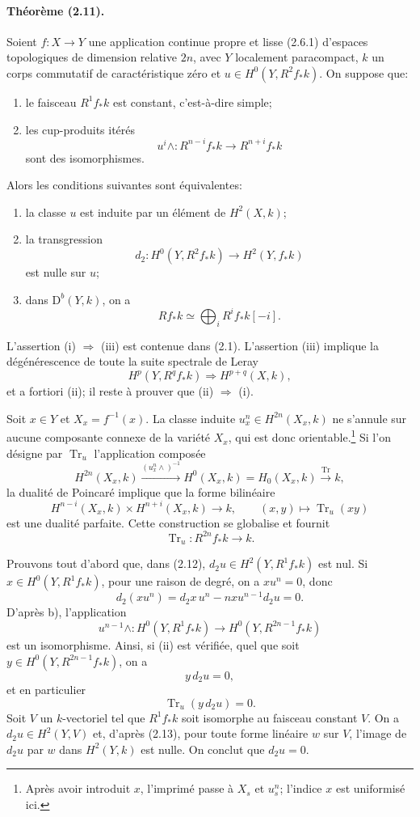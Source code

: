 \documentclass[10pt]{article}
\providecommand{\Tr}{\operatorname{Tr}}
\providecommand{\D}{\mathrm D}
\begin{document}
\paragraph{Théorème (2.11).} Soient $f:X\to Y$ une application continue propre et lisse (2.6.1) d'espaces topologiques de dimension relative $2n$, avec $Y$ localement paracompact, $k$ un corps commutatif de caractéristique zéro et
$u\in H^0(Y,R^2f_*k)$. On suppose que:
\begin{enumerate}[label=\alph*)]
\item le faisceau $R^1f_*k$ est constant, c'est-à-dire simple;
\item les cup-produits itérés
\[
 u^i\wedge:R^{n-i}f_*k\longrightarrow R^{n+i}f_*k
\]
sont des isomorphismes.
\end{enumerate}
Alors les conditions suivantes sont équivalentes:
\begin{enumerate}[label=(\roman*)]
\item la classe $u$ est induite par un élément de $H^2(X,k)$;
\item la transgression
\[
d_2:H^0(Y,R^2f_*k)\longrightarrow H^2(Y,f_*k)
\]
est nulle sur $u$;
\item dans $\D^b(Y,k)$, on a
\[
Rf_*k\simeq\bigoplus_iR^if_*k[-i].
\]
\end{enumerate}
L'assertion (i) $\Rightarrow$ (iii) est contenue dans (2.1). L'assertion (iii) implique la dégénérescence de toute la suite spectrale de Leray
\[
\tag{2.12}
H^p(Y,R^qf_*k)\Longrightarrow H^{p+q}(X,k),
\]
et a fortiori (ii); il reste à prouver que (ii) $\Rightarrow$ (i).

Soit $x\in Y$ et $X_x=f^{-1}(x)$. La classe induite $u_x^n\in H^{2n}(X_x,k)$ ne s'annule sur aucune composante connexe de la variété $X_x$, qui est donc orientable.\footnote{Après avoir introduit $x$, l'imprimé passe à $X_s$ et $u_s^n$; l'indice $x$ est uniformisé ici.} Si l'on désigne par $\Tr_u$ l'application composée
\[
H^{2n}(X_x,k)\xrightarrow{(u_x^n\wedge)^{-1}}H^0(X_x,k)=H_0(X_x,k)\xrightarrow{\Tr}k,
\]
la dualité de Poincaré implique que la forme bilinéaire
\[
H^{n-i}(X_x,k)\times H^{n+i}(X_x,k)\longrightarrow k,
\qquad (x,y)\longmapsto \Tr_u(xy)
\]
est une dualité parfaite. Cette construction se globalise et fournit
\[
\Tr_u:R^{2n}f_*k\longrightarrow k.
\]

Prouvons tout d'abord que, dans (2.12), $d_2u\in H^2(Y,R^1f_*k)$ est nul. Si $x\in H^0(Y,R^1f_*k)$, pour une raison de degré, on a $xu^n=0$, donc
\[
d_2(xu^n)=d_2x\,u^n-nxu^{n-1}d_2u=0.
\]
D'après b), l'application
\[
 u^{n-1}\wedge:H^0(Y,R^1f_*k)\longrightarrow H^0(Y,R^{2n-1}f_*k)
\]
est un isomorphisme. Ainsi, si (ii) est vérifiée, quel que soit $y\in H^0(Y,R^{2n-1}f_*k)$, on a
\[
y\,d_2u=0,
\]
et en particulier
\[
\tag{2.13}
\Tr_u(y\,d_2u)=0.
\]
Soit $V$ un $k$-vectoriel tel que $R^1f_*k$ soit isomorphe au faisceau constant $V$. On a $d_2u\in H^2(Y,V)$ et, d'après (2.13), pour toute forme linéaire $w$ sur $V$, l'image de $d_2u$ par $w$ dans $H^2(Y,k)$ est nulle. On conclut que $d_2u=0$.
\end{document}
